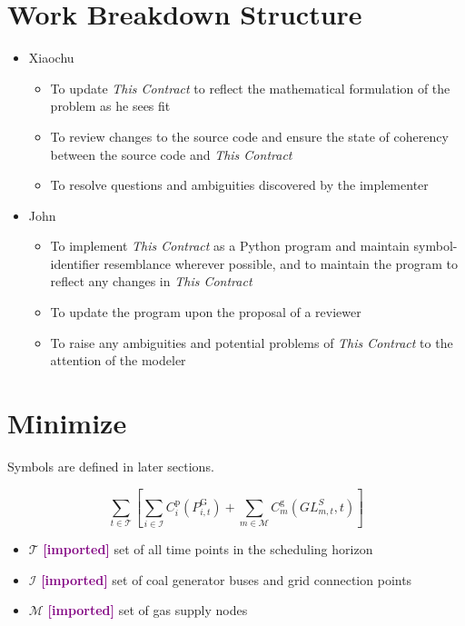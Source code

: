 \documentclass{article}
\newcommand{\imported}{\textcolor{purple}{\textbf{[imported] }}}
\newcommand{\this}{\emph{This Contract }}
\def\sT{\mathcal T}
\def\sM{\mathcal M}
\def\sI{\mathcal I}
\begin{document}
\section{Work Breakdown Structure}
\begin{itemize}
\item Xiaochu
  \begin{itemize}
  \item To update \this to reflect the mathematical formulation of the problem
    as he sees fit
  \item To review changes to the source code and ensure the state of coherency
    between the source code and \this
  \item To resolve questions and ambiguities discovered by the implementer
  \end{itemize}
\item John
  \begin{itemize}
  \item To implement \this as a Python program and maintain symbol-identifier
    resemblance wherever possible, and to maintain the program to reflect any
    changes in \this
  \item To update the program upon the proposal of a reviewer
  \item To raise any ambiguities and potential problems of \this to the
    attention of the modeler
  \end{itemize}
\end{itemize}



\section{Minimize}
Symbols are defined in later sections.

\begin{equation*}
  \sum_{t \in \sT} \left[ \sum_{i \in \sI} C^{\text{p}}_i (P^{\text{G}}_{i,t}) +
    \sum_{m \in \sM} C^{\text{g}}_m (GL^S_{m,t}, t) \right]
\end{equation*}
\begin{itemize}
\item $\sT$ \imported set of all time points in the scheduling horizon
\item $\sI$ \imported set of coal generator buses and grid connection points
\item $\sM$ \imported set of gas supply nodes
\end{itemize}
\end{document}
